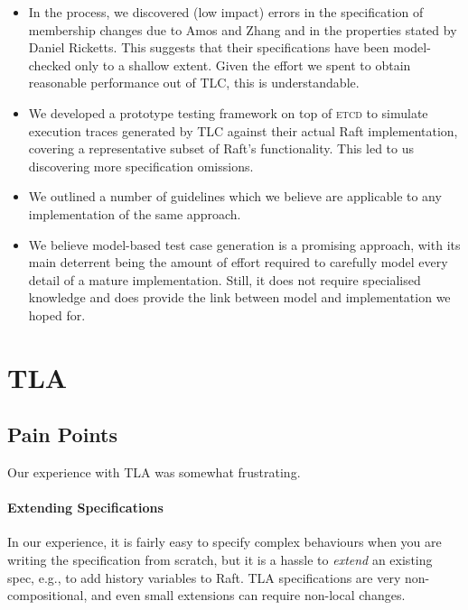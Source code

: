 \documentclass[a4paper]{article}
\makeatletter
\newcommand{\tname}[1]{\textsc{#1}\xspace}
\newcommand{\etcd}{\tname{etcd}}
\newcommand*{\eg}{e.g.\@\xspace}
\makeatother
\begin{document}
\begin{itemize}
    \item In the process, we discovered (low impact) errors in the
    specification of membership changes due to Amos and Zhang and in the
    properties stated by Daniel Ricketts.
    This suggests that their specifications have been model-checked only to a shallow extent.
    Given the effort we spent to obtain reasonable performance out of TLC, this is understandable.

    \item We developed a prototype testing framework on top of \etcd to simulate execution traces generated by TLC against their actual Raft implementation, covering a representative subset of Raft's functionality.
    This led to us discovering more specification omissions.

    \item We outlined a number of guidelines which we believe are applicable to any implementation of the same approach.

    \item We believe model-based test case generation is a promising approach, with its main deterrent being the amount of effort required to carefully model every detail of a mature implementation. Still, it does not require specialised knowledge and does provide the link between model and implementation we hoped for.

\end{itemize}

\section{TLA}

\subsection{Pain Points}

Our experience with TLA was somewhat frustrating.

\paragraph{Extending Specifications}
%
In our experience, it is fairly easy to specify complex behaviours when you are writing the specification from scratch, but it is a hassle to \emph{extend} an existing spec, \eg, to add history variables to Raft. 
%
TLA specifications are very non-compositional, and even small extensions can require non-local changes.
\end{document}
